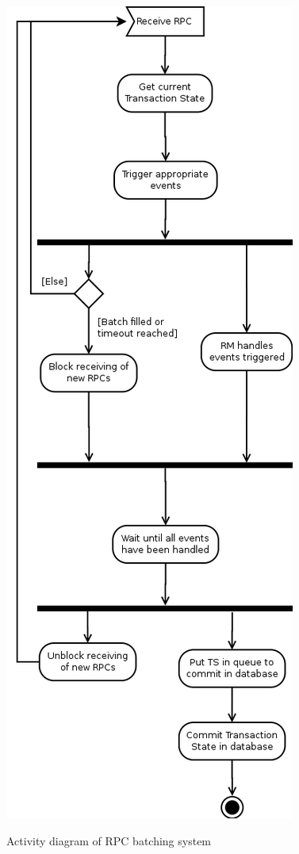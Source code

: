 \begin{figure}
\centering
\includegraphics[scale=0.4]{resources/images/Implementation/rpc_batch_system_activity.png}
\label{fig:impl_rpc_batch_system}
\caption{Activity diagram of RPC batching system}
\end{figure}

